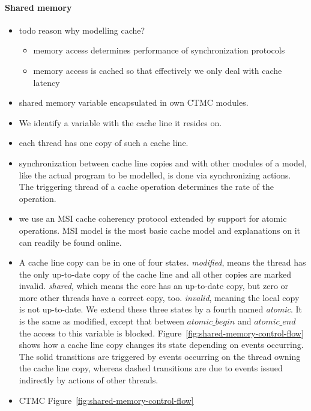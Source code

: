 \documentclass[a4paper, 10pt]{article}
\begin{document}
\begin{enumerate}
\paragraph{Shared memory}
\label{sssec:analysis-modelchecking-modelling-shared-memory}
\begin{itemize}
	\item todo reason why modelling cache?
		\begin{itemize}
			\item memory access determines performance of synchronization protocols
			\item memory access is cached so that effectively we only deal with cache latency
		\end{itemize}
	\item shared memory variable encapsulated in own CTMC modules.
	\item We identify a variable with the cache line it resides on.
	\item each thread has one copy of such a cache line.
	\item synchronization between cache line copies and with other modules of a model, like the actual program to be modelled, is done via synchronizing actions. The triggering thread of a cache operation determines the rate of the operation.
	\item we use an MSI cache coherency protocol extended by support for atomic operations. MSI model is the most basic cache model and explanations on it can readily be found online\cite{msi}.
	\item A cache line copy can be in one of four states. \emph{modified}, means the thread has the only up-to-date copy of the cache line and all other copies are marked invalid. \emph{shared}, which means the core has an up-to-date copy, but zero or more other threads have a correct copy, too. \emph{invalid}, meaning the local copy is not up-to-date. We extend these three states by a fourth named \emph{atomic}. It is the same as modified, except that between $\mathit{atomic\_begin}$ and $\mathit{atomic\_end}$ the access to this variable is blocked. Figure~\ref{fig:shared-memory-control-flow} shows how a cache line copy changes its state depending on events occurring. The solid transitions are triggered by events occurring on the thread owning the cache line copy, whereas dashed transitions are due to events issued indirectly by actions of other threads.
	\item CTMC Figure~\ref{fig:shared-memory-control-flow}
		\begin{figure}[htbp]

\end{figure}
\end{itemize}
\end{enumerate}
\end{document}
